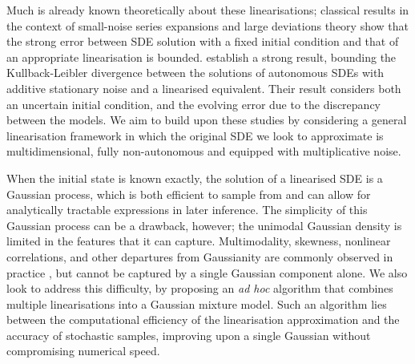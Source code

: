 Much is already known theoretically about these linearisations; classical results in the context of small-noise series expansions \citep{Blagoveshchenskii_1962_DiffusionProcessesDepending} and large deviations theory \citep{FreidlinWentzell_1998_RandomPerturbationsDynamical} show that the strong error between SDE solution with a fixed initial condition and that of an appropriate linearisation is bounded.
\citet{Sanz-AlonsoStuart_2017_GaussianApproximationsSmall} establish a strong result, bounding the Kullback-Leibler divergence between the solutions of autonomous SDEs with additive stationary noise and a linearised equivalent.
Their result considers both an uncertain initial condition, and the evolving error due to the discrepancy between the models.
We aim to build upon these studies by considering a general linearisation framework in which the original SDE we look to approximate is multidimensional, fully non-autonomous and equipped with multiplicative noise.

When the initial state is known exactly, the solution of a linearised SDE is a Gaussian process, which is both efficient to sample from and can allow for analytically tractable expressions in later inference.
The simplicity of this Gaussian process can be a drawback, however; the unimodal Gaussian density is limited in the features that it can capture.
Multimodality, skewness, nonlinear correlations, and other departures from Gaussianity are commonly observed in practice \citep{SuraEtAl_2005_MultiplicativeNoiseNonGaussianity,BraccoEtAl_2000_VelocityProbabilityDensity,del-Castillo-Negrete_1998_AsymmetricTransportNonGaussian}, but cannot be captured by a single Gaussian component alone.
We also look to address this difficulty, by proposing an \emph{ad hoc} algorithm that combines multiple linearisations into a Gaussian mixture model.
Such an algorithm lies between the computational efficiency of the linearisation approximation and the accuracy of stochastic samples, improving upon a single Gaussian without compromising numerical speed.

